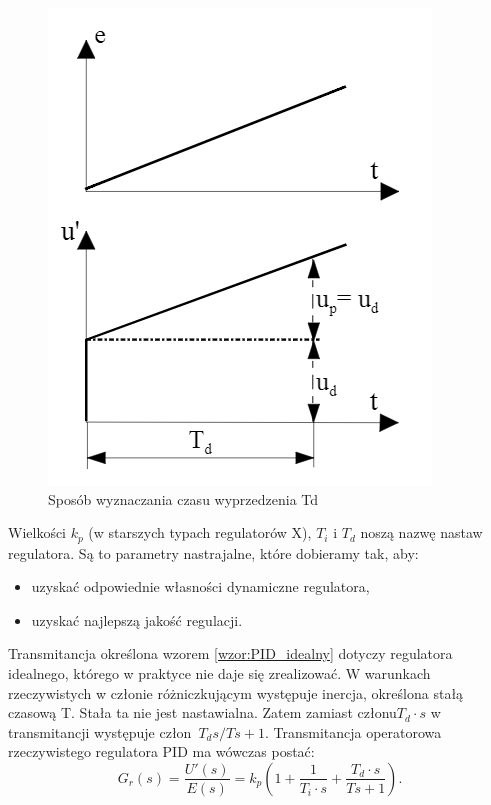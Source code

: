 \documentclass[a4paper,twoside]{report}
\begin{document}
\begin{figure}[htbp]
\centering
\includegraphics[scale=0.5]{obrazy/czas_wyprzedzenia.png}
\caption{Sposób wyznaczania czasu wyprzedzenia Td}
\label{rys:czas_wyprzedzenia}
\end{figure}

Wielkości $k_p$ (w starszych typach regulatorów X), $T_i$ i $T_d$ noszą nazwę nastaw regulatora. Są to parametry nastrajalne, które dobieramy tak, aby:
\begin{itemize}
\item uzyskać odpowiednie własności dynamiczne regulatora,
\item uzyskać najlepszą jakość regulacji.
\end{itemize}

Transmitancja określona wzorem \eqref{wzor:PID_idealny} dotyczy regulatora idealnego, którego w praktyce nie daje  się  zrealizować.  W  warunkach  rzeczywistych  w  członie  różniczkującym  występuje inercja, określona stałą czasową T. Stała ta nie jest nastawialna. Zatem zamiast członu\linebreak $T_d \cdot s$ w transmitancji  występuje  człon~$T_ds/Ts+1$. Transmitancja  operatorowa  rzeczywistego  regulatora PID ma wówczas postać:
\begin{equation}
G_r(s)=\dfrac{U'(s)}{E(s)} = k_p(1+\dfrac{1}{T_i \cdot s}+ \dfrac{T_d \cdot s}{T s + 1}).
\end{equation}
\end{document}
